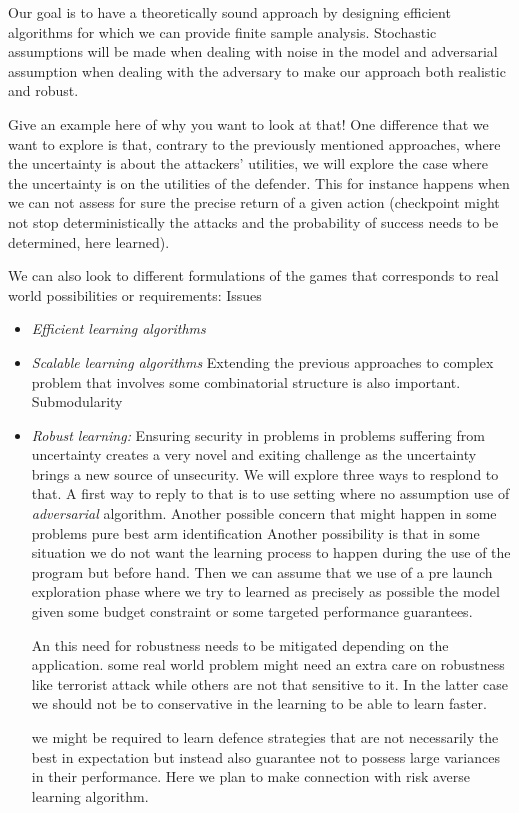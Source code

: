 Our goal is to have a theoretically sound approach by designing efficient algorithms for which we can provide finite sample analysis.
Stochastic assumptions will be made when dealing with noise in the model and adversarial assumption when dealing with the adversary to make our approach both realistic and robust.

Give an example here of why you want to look at that!
One difference that we want to explore is that, contrary to the previously mentioned approaches, where the uncertainty is  about the attackers' utilities, we will explore the case where the uncertainty is on the utilities of the defender. This for instance happens when we can not assess for sure the precise return of a given action (checkpoint might not stop deterministically the attacks and the probability of success needs to be determined, here learned).





We can also look to different formulations of the games that corresponds to real world possibilities or requirements:
Issues
\begin{itemize}
\item \textit{Efficient learning algorithms}
\item \textit{Scalable learning algorithms} Extending the previous approaches to complex problem that involves some combinatorial structure is also important. Submodularity
\item \textit{Robust learning:} Ensuring security in problems in problems suffering from uncertainty creates a very novel and exiting challenge as the uncertainty brings a new source of unsecurity. We will explore three ways to resplond to that.
A first way to  reply to that is to use setting where no assumption use of \textit{adversarial} algorithm.
 Another possible concern that might happen in some problems pure best arm identification 
 Another possibility is that in some situation we do not want the learning process to happen during the use of the program but before hand. Then we can assume that we use of a pre launch exploration phase where we try to learned as precisely as possible the model given some budget constraint or some targeted performance guarantees. 
  
 An
this need for robustness needs to be mitigated depending on the application. some real world problem might need an extra care on robustness like terrorist attack while others are not that sensitive to it.
 In the latter case we should not be to conservative in the learning to be able to learn faster.

 we might be required to learn defence strategies that are not necessarily the best in expectation but instead also guarantee not to possess large variances in their performance. Here we plan to make connection with risk averse learning algorithm.
\end{itemize}


